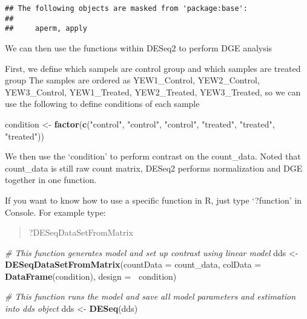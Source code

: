 \documentclass[]{article}
\newenvironment{Shaded}{\begin{snugshade}}{\end{snugshade}}
\newcommand{\KeywordTok}[1]{\textcolor[rgb]{0.13,0.29,0.53}{\textbf{#1}}}
\newcommand{\DataTypeTok}[1]{\textcolor[rgb]{0.13,0.29,0.53}{#1}}
\newcommand{\StringTok}[1]{\textcolor[rgb]{0.31,0.60,0.02}{#1}}
\newcommand{\CommentTok}[1]{\textcolor[rgb]{0.56,0.35,0.01}{\textit{#1}}}
\newcommand{\OperatorTok}[1]{\textcolor[rgb]{0.81,0.36,0.00}{\textbf{#1}}}
\newcommand{\NormalTok}[1]{#1}
\begin{document}
\begin{verbatim}
## The following objects are masked from 'package:base':
## 
##     aperm, apply
\end{verbatim}

We can then use the functions within DESeq2 to perform DGE analysis

First, we define which sampels are control group and which samples are
treated group The samples are ordered as YEW1\_Control, YEW2\_Control,
YEW3\_Control, YEW1\_Treated, YEW2\_Treated, YEW3\_Treated, so we can
use the following to define conditions of each sample

\begin{Shaded}
\begin{Highlighting}[]
\NormalTok{condition <-}\StringTok{ }\KeywordTok{factor}\NormalTok{(}\KeywordTok{c}\NormalTok{(}\StringTok{"control"}\NormalTok{, }\StringTok{"control"}\NormalTok{, }\StringTok{"control"}\NormalTok{,}
                      \StringTok{"treated"}\NormalTok{, }\StringTok{"treated"}\NormalTok{, }\StringTok{"treated"}\NormalTok{))}
\end{Highlighting}
\end{Shaded}

We then use the `condition' to perform contrast on the count\_data.
Noted that count\_data is still raw count matrix, DESeq2 performs
normalization and DGE together in one function.

If you want to know how to use a specific function in R, just type
`?function' in Console. For example type:

\begin{quote}
?DESeqDataSetFromMatrix
\end{quote}

\begin{Shaded}
\begin{Highlighting}[]
\CommentTok{# This function generates model and set up contrast using linear model}
\NormalTok{dds <-}\StringTok{ }\KeywordTok{DESeqDataSetFromMatrix}\NormalTok{(}\DataTypeTok{countData =}\NormalTok{ count_data,}
                              \DataTypeTok{colData =} \KeywordTok{DataFrame}\NormalTok{(condition),}
                              \DataTypeTok{design =} \OperatorTok{~}\NormalTok{condition)}

\CommentTok{# This function runs the model and save all model parameters and estimation into dds object}
\NormalTok{dds <-}\StringTok{ }\KeywordTok{DESeq}\NormalTok{(dds)}
\end{Highlighting}
\end{Shaded}
\end{document}
